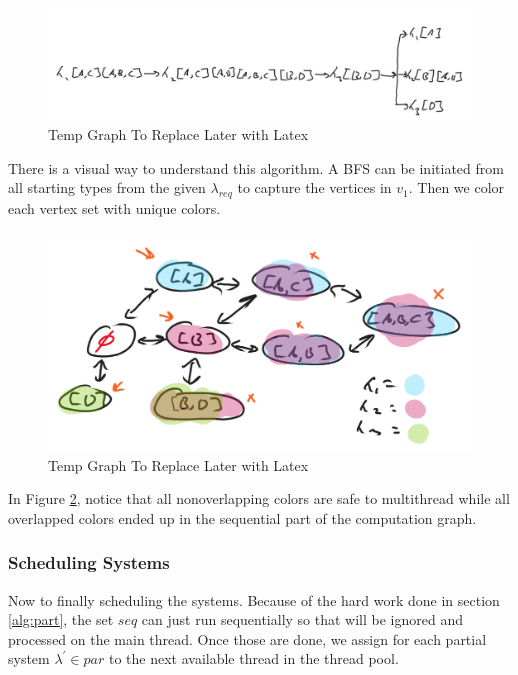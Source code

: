 \begin{figure}[H]
    \centering
    \includegraphics[width=0.5\linewidth]{resources/computation_graph.png}
    \caption{Temp Graph To Replace Later with Latex}
    \label{fig:temp1}
\end{figure}

There is a visual way to understand this algorithm. A BFS can be initiated from all starting types from the given $\lambda_{req}$ to capture the vertices in $v_1$. Then we color each vertex set with unique colors. 

\begin{figure}[H]
    \centering
    \includegraphics[width=0.5\linewidth]{resources/color_graph.png}
    \caption{Temp Graph To Replace Later with Latex}
    \label{fig:graph2}
\end{figure}

In Figure \ref{fig:graph2}, notice that all nonoverlapping colors are safe to multithread while all overlapped colors ended up in the sequential part of the computation graph.

\subsubsection{Scheduling Systems}
Now to finally scheduling the systems. Because of the hard work done in section \ref{alg:part}, the set $seq$ can just run sequentially so that will be ignored and processed on the main thread. Once those are done, we assign for each partial system $\lambda^\prime \in par$ to the next available thread in the thread pool. 
